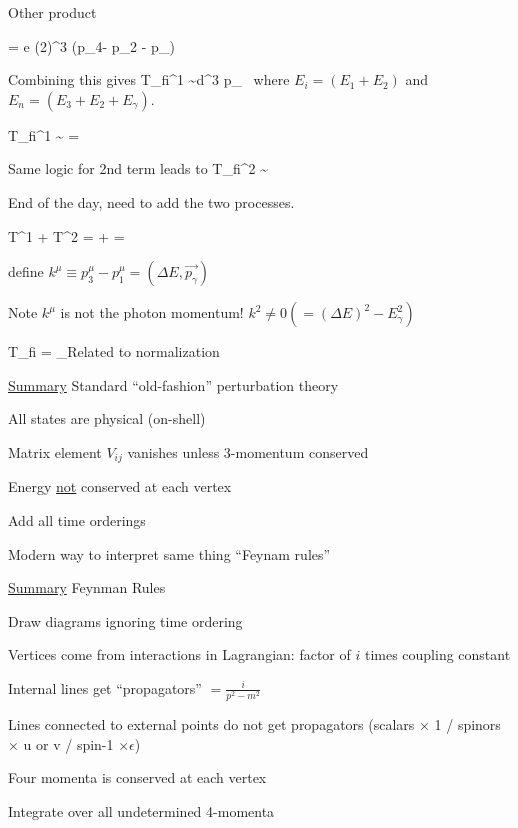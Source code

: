 {Other product

\be
{} = e (2\pi)^3 \delta(p_4- p_2 - p_\gamma)
\ee

Combining this gives
\be
T_{fi}^1 \sim \int d^3 p_\gamma\  \delta \delta  {}
\ee
where $E_i = (E_1 + E_2)$ and $E_n = (E_3 + E_2 + E_\gamma)$.


\be
T_{fi}^1 \sim   {} = 
\ee

Same logic for 2nd term leads to
\be
T_{fi}^2 \sim  {}
\ee


End of the day, need to add the two processes.




\be
T^{1} + T^{2} =  +  = 
\ee

define $k^\mu \equiv p_3^\mu - p_1^\mu = (\Delta E, \vec{p_\gamma})$

Note $k^\mu$ is not the photon momentum!  $k^2 \ne 0  (= (\Delta E)^2 - E_\gamma^2)$

\be
T_{fi} = _{\textrm{Related to normalization}} 
\ee

\underline{Summary} Standard ``old-fashion'' perturbation theory
\bi
\item[-] All states are physical (on-shell)
\item[-] Matrix element $V_{ij}$ vanishes unless 3-momentum conserved
\item[-] Energy \underline{not} conserved at each vertex
\item[-] Add all time orderings
\ei


Modern way to interpret same thing ``Feynam rules'' 

\underline{Summary} Feynman Rules
\bi
\item[-] Draw diagrams ignoring time ordering
\item[-] Vertices come from interactions in Lagrangian: factor of $i$ times coupling constant
\item[-] Internal lines get ``propagators'' $= \frac{i}{p^2 - m^2}$
\item[-] Lines connected to external points do not get propagators (scalars $\times$ 1 / spinors $\times$ u or v / spin-1 $\times \epsilon$)
\item[-] Four momenta is conserved at each vertex
\item[-] Integrate over all undetermined 4-momenta
\ei

}

